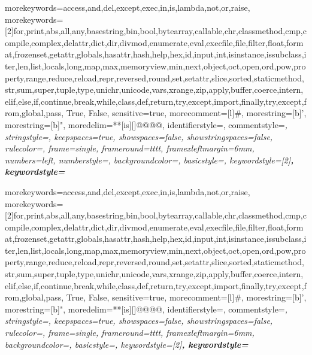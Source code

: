 \usepackage{cprotect}
 {
	morekeywords={access,and,del,except,exec,in,is,lambda,not,or,raise},
	morekeywords=[2]{for,print,abs,all,any,basestring,bin,bool,bytearray,callable,chr,classmethod,cmp,compile,complex,delattr,dict,dir,divmod,enumerate,eval,execfile,file,filter,float,format,frozenset,getattr,globals,hasattr,hash,help,hex,id,input,int,isinstance,issubclass,iter,len,list,locals,long,map,max,memoryview,min,next,object,oct,open,ord,pow,property,range,reduce,reload,repr,reversed,round,set,setattr,slice,sorted,staticmethod,str,sum,super,tuple,type,unichr,unicode,vars,xrange,zip,apply,buffer,coerce,intern,elif,else,if,continue,break,while,class,def,return,try,except,import,finally,try,except,from,global,pass, True, False},
	sensitive=true,
	morecomment=[l]\#,%
	morestring=[b]',%
	morestring=[b]",%
	moredelim=**[is][\color{black}]{@@}{@@},
	identifierstyle=\color{black}\footnotesize\ttfamily,
    commentstyle=\color{ipython-cyan}\footnotesize\itshape\ttfamily,
	stringstyle=\color{ipython-red}\footnotesize\ttfamily,
	keepspaces=true,
	showspaces=false,
    showstringspaces=false,
	rulecolor=\color{ipython-frame},
	frame=single,
	frameround={t}{t}{t}{t},
	framexleftmargin=6mm,
	numbers=left,
	numberstyle=\color{ipython-cyan},
	backgroundcolor=\color{ipython-bg},
	basicstyle=\footnotesize\ttfamily,
	keywordstyle=[2]\color{ipython-green}\bfseries\footnotesize\ttfamily, 
	keywordstyle=\color{ipython-purple}\bfseries\footnotesize\ttfamily
}

 {
	morekeywords={access,and,del,except,exec,in,is,lambda,not,or,raise},
	morekeywords=[2]{for,print,abs,all,any,basestring,bin,bool,bytearray,callable,chr,classmethod,cmp,compile,complex,delattr,dict,dir,divmod,enumerate,eval,execfile,file,filter,float,format,frozenset,getattr,globals,hasattr,hash,help,hex,id,input,int,isinstance,issubclass,iter,len,list,locals,long,map,max,memoryview,min,next,object,oct,open,ord,pow,property,range,reduce,reload,repr,reversed,round,set,setattr,slice,sorted,staticmethod,str,sum,super,tuple,type,unichr,unicode,vars,xrange,zip,apply,buffer,coerce,intern,elif,else,if,continue,break,while,class,def,return,try,except,import,finally,try,except,from,global,pass, True, False},
	sensitive=true,
	morecomment=[l]\#,%
	morestring=[b]',%
	morestring=[b]",%
	moredelim=**[is][\color{black}]{@@}{@@},
	identifierstyle=\color{black}\footnotesize\ttfamily,
	commentstyle=\color{ipython-cyan}\footnotesize\itshape\ttfamily,
	stringstyle=\color{ipython-red}\footnotesize\ttfamily,
	keepspaces=true,
	showspaces=false,
	showstringspaces=false,
	rulecolor=\color{ipython-frame},
	frame=single,
	frameround={t}{t}{t}{t},
	framexleftmargin=6mm,
	backgroundcolor=\color{ipython-bg},
	basicstyle=\footnotesize\ttfamily,
	keywordstyle=[2]\color{ipython-green}\bfseries\footnotesize\ttfamily, 
	keywordstyle=\color{ipython-purple}\bfseries\footnotesize\ttfamily
}

